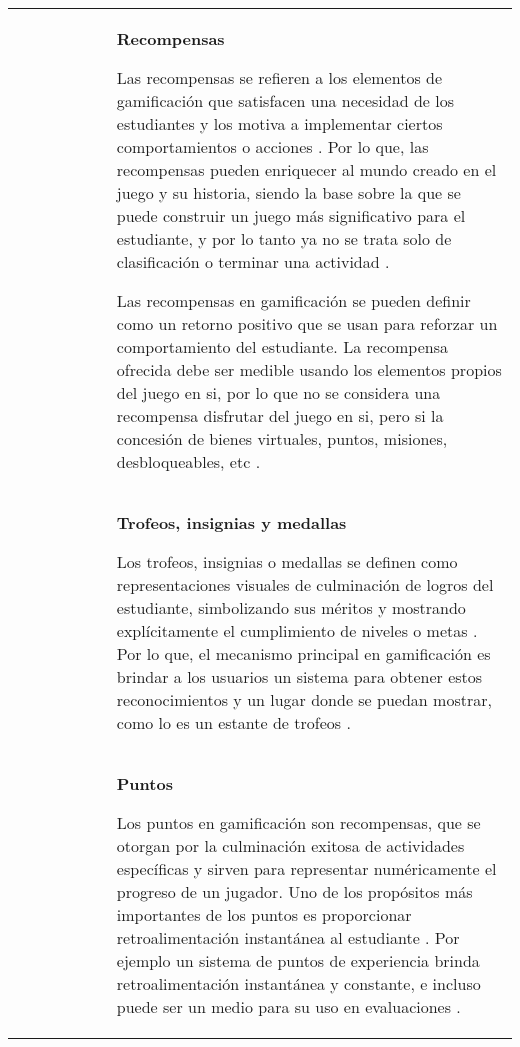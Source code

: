\addtocounter{table}{-1}       %
\bgroup
\def\arraystretch{2}
\setlength{\tabcolsep}{0pt}
\begin{longtable}{C{0.2\linewidth} P{0.8\linewidth}}
 & \textbf{Recompensas}

Las recompensas se refieren a los elementos de gamificación que satisfacen una necesidad de los estudiantes y
los motiva a implementar ciertos comportamientos o acciones \cite{doi:10.1089/cyber.2012.0492}. Por lo que, 
las recompensas pueden enriquecer al mundo creado en el juego y su historia, siendo la base sobre la que se 
puede construir un juego más significativo para el estudiante, y por lo tanto ya no se trata solo de 
clasificación o terminar una actividad \cite{PRESTOPNIK2015492}.

Las recompensas en gamificación se pueden definir como un retorno positivo que se usan para reforzar un 
comportamiento del estudiante. La recompensa ofrecida debe ser medible usando los elementos propios del juego 
en si, por lo que no se considera una recompensa disfrutar del juego en si, pero si la concesión de bienes 
virtuales, puntos, misiones, desbloqueables, etc \cite{Phillips2013}.
\\
 & \textbf{Trofeos, insignias y medallas} 

Los trofeos, insignias o medallas se definen como representaciones visuales de culminación de logros del
estudiante, simbolizando sus méritos y mostrando explícitamente el cumplimiento de niveles o metas
\cite{SAILER2017371}. Por lo que, el mecanismo principal en gamificación es brindar a los usuarios un sistema
para obtener estos reconocimientos y un lugar donde se puedan mostrar, como lo es un estante de trofeos
\cite{DAROCHASEIXAS201648}.
\\
 & \textbf{Puntos}

Los puntos en gamificación son recompensas, que se otorgan por la culminación exitosa de actividades 
específicas y sirven para representar numéricamente el progreso de un jugador. Uno de los propósitos más 
importantes de los puntos es proporcionar retroalimentación instantánea al estudiante \cite{SAILER2017371}.
Por ejemplo un sistema de puntos de experiencia brinda retroalimentación instantánea y constante, e incluso 
puede ser un medio para su uso en evaluaciones \cite{Danka2020}.


\end{longtable}

